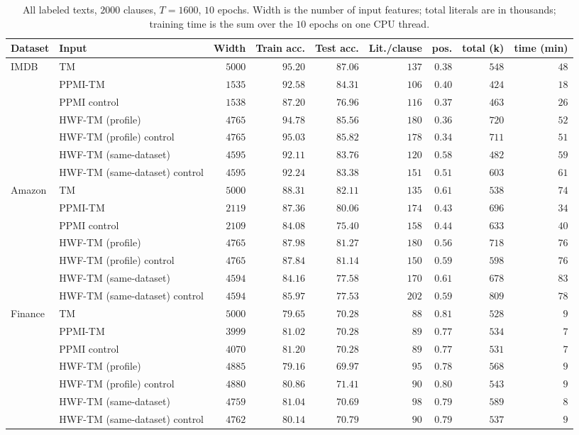 \begin{table}[H]
\centering
\small
\setlength{\tabcolsep}{4pt}
\caption{All labeled texts, $2000$ clauses, $T = 1600$, $10$ epochs. Width is the number of input
features; total literals are in thousands; training time is the sum over the $10$ epochs on one
CPU thread.}
\label{tab:app-full}
\begin{tabular}{llrrrrrrr}
\toprule
Dataset & Input & Width & Train acc. & Test acc. & Lit./clause & pos. & total (k) & time (min) \\
\midrule
IMDB & TM & $5000$ & $95.20$ & $87.06$ & $137$ & $0.38$ & $548$ & $48$ \\
 & PPMI-TM & $1535$ & $92.58$ & $84.31$ & $106$ & $0.40$ & $424$ & $18$ \\
 & PPMI control & $1538$ & $87.20$ & $76.96$ & $116$ & $0.37$ & $463$ & $26$ \\
 & HWF-TM (profile) & $4765$ & $94.78$ & $85.56$ & $180$ & $0.36$ & $720$ & $52$ \\
 & HWF-TM (profile) control & $4765$ & $95.03$ & $85.82$ & $178$ & $0.34$ & $711$ & $51$ \\
 & HWF-TM (same-dataset) & $4595$ & $92.11$ & $83.76$ & $120$ & $0.58$ & $482$ & $59$ \\
 & HWF-TM (same-dataset) control & $4595$ & $92.24$ & $83.38$ & $151$ & $0.51$ & $603$ & $61$ \\
\midrule
Amazon & TM & $5000$ & $88.31$ & $82.11$ & $135$ & $0.61$ & $538$ & $74$ \\
 & PPMI-TM & $2119$ & $87.36$ & $80.06$ & $174$ & $0.43$ & $696$ & $34$ \\
 & PPMI control & $2109$ & $84.08$ & $75.40$ & $158$ & $0.44$ & $633$ & $40$ \\
 & HWF-TM (profile) & $4765$ & $87.98$ & $81.27$ & $180$ & $0.56$ & $718$ & $76$ \\
 & HWF-TM (profile) control & $4765$ & $87.84$ & $81.14$ & $150$ & $0.59$ & $598$ & $76$ \\
 & HWF-TM (same-dataset) & $4594$ & $84.16$ & $77.58$ & $170$ & $0.61$ & $678$ & $83$ \\
 & HWF-TM (same-dataset) control & $4594$ & $85.97$ & $77.53$ & $202$ & $0.59$ & $809$ & $78$ \\
\midrule
Finance & TM & $5000$ & $79.65$ & $70.28$ & $88$ & $0.81$ & $528$ & $9$ \\
 & PPMI-TM & $3999$ & $81.02$ & $70.28$ & $89$ & $0.77$ & $534$ & $7$ \\
 & PPMI control & $4070$ & $81.20$ & $70.28$ & $89$ & $0.77$ & $531$ & $7$ \\
 & HWF-TM (profile) & $4885$ & $79.16$ & $69.97$ & $95$ & $0.78$ & $568$ & $9$ \\
 & HWF-TM (profile) control & $4880$ & $80.86$ & $71.41$ & $90$ & $0.80$ & $543$ & $9$ \\
 & HWF-TM (same-dataset) & $4759$ & $81.04$ & $70.69$ & $98$ & $0.79$ & $589$ & $8$ \\
 & HWF-TM (same-dataset) control & $4762$ & $80.14$ & $70.79$ & $90$ & $0.79$ & $537$ & $9$ \\
\bottomrule
\end{tabular}
\end{table}

